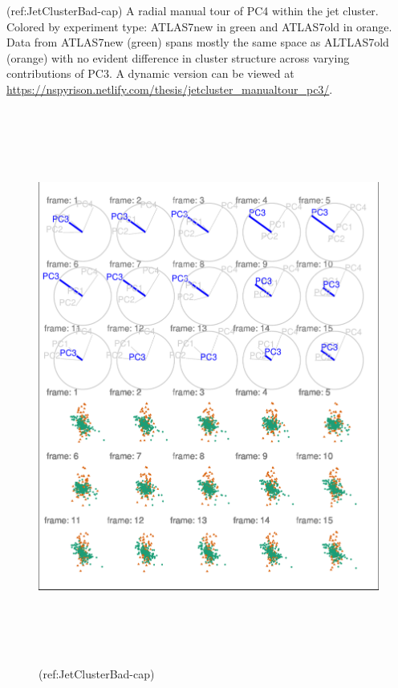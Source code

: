 (ref:JetClusterBad-cap) A radial manual tour of PC4 within the jet
cluster. Colored by experiment type: ATLAS7new in green and ATLAS7old in
orange. Data from ATLAS7new (green) spans mostly the same space as
ALTLAS7old (orange) with no evident difference in cluster structure
across varying contributions of PC3. A dynamic version can be viewed at
\url{https://nspyrison.netlify.com/thesis/jetcluster_manualtour_pc3/}.

\begin{Schunk}
\begin{figure}

{\centering \includegraphics[width=6in,height=7.2in]{spinifex_paper_files/figure-latex/JetClusterBad-1} 

}

\caption[(ref:JetClusterBad-cap)]{(ref:JetClusterBad-cap)}\label{fig:JetClusterBad}
\end{figure}
\end{Schunk}

